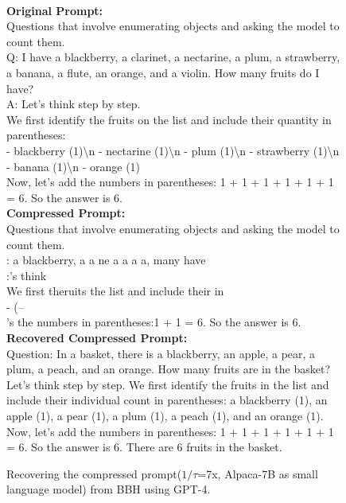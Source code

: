 \begin{figure*}
\begin{minipage}[t]{\linewidth}
        \label{fig:prompt_recovered_gpt2}
	\end{minipage}
	\\
	\begin{minipage}[t]{\linewidth}
        \begin{tcolorbox}
        \textbf{Original Prompt:} \\
        Questions that involve enumerating objects and asking the model to count them.\\
        Q: I have a blackberry, a clarinet, a nectarine, a plum, a strawberry, a banana, a flute, an orange, and a violin. How many fruits do I have?\\
        A: Let's think step by step.\\
        We first identify the fruits on the list and include their quantity in parentheses:\\
        - blackberry (1)\textbackslash n
        - nectarine (1)\textbackslash n
        - plum (1)\textbackslash n
        - strawberry (1)\textbackslash n
        - banana (1)\textbackslash n
        - orange (1)\\
        Now, let's add the numbers in parentheses: 1 + 1 + 1 + 1 + 1 + 1 = 6. So the answer is 6.\\
        \textbf{Compressed Prompt:}\\
        Questions that involve enumerating objects and asking the model to count them.\\
        : a blackberry, a a ne a a a a, many have\\
        :'s think\\
        We first theruits the list and include their in\\
        - (--\\
        's the numbers in parentheses:1 + 1 = 6. So the answer is 6.\\
        \textbf{Recovered Compressed Prompt:}\\
        Question: In a basket, there is a blackberry, an apple, a pear, a plum, a peach, and an orange. How many fruits are in the basket?\\
        Let's think step by step. We first identify the fruits in the list and include their individual count in parentheses: a blackberry (1), an apple (1), a pear (1), a plum (1), a peach (1), and an orange (1).\\
        Now, let's add the numbers in parentheses: 1 + 1 + 1 + 1 + 1 + 1 = 6. So the answer is 6. There are 6 fruits in the basket.
        \end{tcolorbox}
        \caption{Recovering the compressed prompt($1/\tau$=7x, Alpaca-7B as small language model) from BBH using GPT-4.}
        \label{fig:prompt_recovered_bbh}
	\end{minipage}
\end{figure*}



